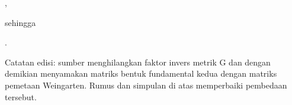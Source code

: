 { { , }

sehingga

 { . }

Catatan edisi: sumber menghilangkan faktor invers metrik G dan dengan demikian menyamakan matriks bentuk fundamental kedua dengan matriks pemetaan Weingarten. Rumus dan simpulan di atas memperbaiki pembedaan tersebut.

}
